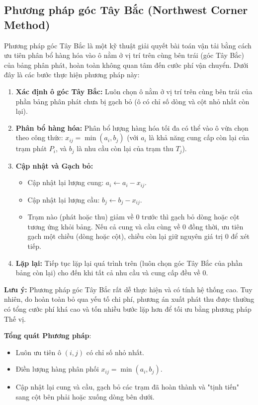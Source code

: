 \subsection{Phương pháp góc Tây Bắc (Northwest Corner Method)}

Phương pháp góc Tây Bắc là một kỹ thuật giải quyết bài toán vận tải bằng cách ưu tiên phân bổ hàng hóa vào ô nằm ở vị trí trên cùng bên trái (góc Tây Bắc) của bảng phân phát, hoàn toàn không quan tâm đến cước phí vận chuyển. Dưới đây là các bước thực hiện phương pháp này:

\begin{enumerate}
    \item \textbf{Xác định ô góc Tây Bắc:} Luôn chọn ô nằm ở vị trí trên cùng bên trái của phần bảng phân phát chưa bị gạch bỏ (ô có chỉ số dòng và cột nhỏ nhất còn lại).
    
    \item \textbf{Phân bổ hàng hóa:} Phân bổ lượng hàng hóa tối đa có thể vào ô vừa chọn theo công thức: $x_{ij} = \min(a_i, b_j)$ (với $a_i$ là khả năng cung cấp còn lại của trạm phát $P_i$, và $b_j$ là nhu cầu còn lại của trạm thu $T_j$).
    
    \item \textbf{Cập nhật và Gạch bỏ:} 
    \begin{itemize}
        \item Cập nhật lại lượng cung: $a_i \leftarrow a_i - x_{ij}$.
        \item Cập nhật lại lượng cầu: $b_j \leftarrow b_j - x_{ij}$.
        \item Trạm nào (phát hoặc thu) giảm về 0 trước thì gạch bỏ dòng hoặc cột tương ứng khỏi bảng. Nếu cả cung và cầu cùng về 0 đồng thời, ưu tiên gạch một chiều (dòng hoặc cột), chiều còn lại giữ nguyên giá trị 0 để xét tiếp.
    \end{itemize}
    
    \item \textbf{Lặp lại:} Tiếp tục lặp lại quá trình trên (luôn chọn góc Tây Bắc của phần bảng còn lại) cho đến khi tất cả nhu cầu và cung cấp đều về 0.
\end{enumerate}

\textbf{Lưu ý:} Phương pháp góc Tây Bắc rất dễ thực hiện và có tính hệ thống cao. Tuy nhiên, do hoàn toàn bỏ qua yếu tố chi phí, phương án xuất phát thu được thường có tổng cước phí khá cao và tốn nhiều bước lặp hơn để tối ưu bằng phương pháp Thế vị.

\textbf{Tổng quát Phương pháp}:
\begin{itemize}
    \item Luôn ưu tiên ô $(i, j)$ có chỉ số nhỏ nhất.
    \item Điền lượng hàng phân phối $x_{ij} = \min(a_i, b_j)$.
    \item Cập nhật lại cung và cầu, gạch bỏ các trạm đã hoàn thành và "tịnh tiến" sang cột bên phải hoặc xuống dòng bên dưới.
\end{itemize}

